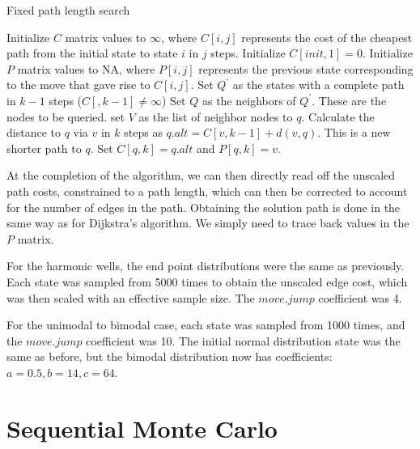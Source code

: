 \begin{algorithm}
\caption{Fixed path length search}
\begin{algorithmic}[1]
    \STATE Initialize $C$ matrix values to $\infty$, where $C[i,j]$ represents the cost of the cheapest path from the initial state to state $i$ in $j$ steps.
    \STATE Initialize $C[init,1]=0$.
    \STATE Initialize $P$ matrix values to NA, where $P[i,j]$ represents the previous state corresponding to the move that gave rise to $C[i,j]$.
        \STATE Set $Q^\prime$ as the states with a complete path in $k-1$ steps ($C[,k-1]\neq \infty$)
        \STATE Set $Q$ as the neighbors of $Q^\prime$. These are the nodes to be queried.
            \STATE set $V$ as the list of neighbor nodes to $q$.
                \STATE Calculate the distance to $q$ via $v$ in $k$ steps as $q.alt = C[v,k-1] + d(v,q)$.
                    \STATE This is a new shorter path to $q$.
                    \STATE Set $C[q,k] = q.alt$ and $P[q,k] = v$.
                \ENDIF
            \ENDFOR
        \ENDFOR
    \ENDFOR
\end{algorithmic}
\end{algorithm}

At the completion of the algorithm, we can then directly read off the unscaled path costs, constrained to a path length, which can then be corrected to account for the number of edges in the path.
Obtaining the solution path is done in the same way as for Dijkstra's algorithm. 
We simply need to trace back values in the $P$ matrix.

For the harmonic wells, the end point distributions were the same as previously. Each state was sampled from 5000 times to obtain the unscaled edge cost, which was then scaled with an effective sample size. The $move.jump$ coefficient was 4.

For the unimodal to bimodal case, each state was sampled from 1000 times, and the $move.jump$ coefficient was 10. The initial normal distribution state was the same as before, but the bimodal distribution now has coefficients: $a=0.5, b=14, c=64$.

\section{Sequential Monte Carlo} %
\label{sec:sequential_monte_carlo}






